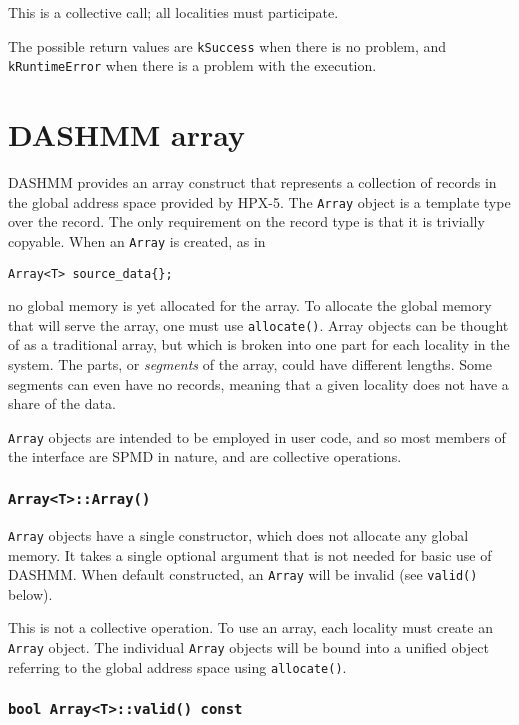 This is a collective call; all localities must participate.

The possible return values are \texttt{kSuccess} when there is no problem, and
\texttt{kRuntimeError} when there is a problem with the execution.


\section{DASHMM array}
DASHMM provides an array construct that represents a collection of records in
the global address space provided by HPX-5. The \texttt{Array} object is a template
type over the record. The only requirement on the record type is that it is
trivially copyable. When an \texttt{Array} is created, as in

\begin{verbatim}
Array<T> source_data{};
\end{verbatim}

\noindent no global memory is yet allocated for the array. To allocate the
global memory that will serve the array, one must use \texttt{allocate()}.
Array objects can be thought of as a traditional array,
but which is broken into one part for each locality in the system. The parts,
or \emph{segments} of the array, could have different lengths. Some segments can
even have no records, meaning that a given locality does not have a share of
the data.

\texttt{Array} objects are intended to be employed in user code, and so most
members of the interface are SPMD in nature, and are collective operations.

\subsubsection{\texttt{Array<T>::Array()}}

\texttt{Array} objects have a single constructor, which does not allocate any
global memory. It takes a single optional argument that is not needed for basic
use of DASHMM. When default constructed, an \texttt{Array} will be invalid (see
\texttt{valid()} below).

This is not a collective operation. To use an array, each locality must create
an \texttt{Array} object. The individual \texttt{Array} objects will be bound
into a unified object referring to the global address space using
\texttt{allocate()}.

\subsubsection{\texttt{bool Array<T>::valid() const}}


